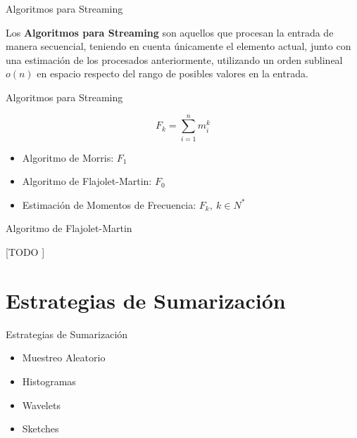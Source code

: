 \documentclass[12pt]{beamer}
\begin{document}
    \begin{frame}[fragile]{Algoritmos para Streaming}

      Los \textbf{Algoritmos para Streaming} son aquellos que procesan la entrada de manera secuencial, teniendo en cuenta únicamente el elemento actual, junto con una estimación de los procesados anteriormente, utilizando un orden sublineal $o(n)$ en espacio respecto del rango de posibles valores en la entrada.

    \end{frame}

    \begin{frame}[fragile]{Algoritmos para Streaming}

      \begin{equation}
        F_k = \sum_{i=1}^n m_i^k
      \end{equation}

      \begin{itemize}
        \item Algoritmo de Morris: $F_1$
        \item Algoritmo de Flajolet-Martin: $F_0$
        \item Estimación de Momentos de Frecuencia: $F_k, \ k \in N^*$
      \end{itemize}

    \end{frame}

    \begin{frame}[fragile]{Algoritmo de Flajolet-Martin}

      [TODO ]

    \end{frame}

  \section{Estrategias de Sumarización}

    \begin{frame}[fragile]{Estrategias de Sumarización}

      \begin{itemize}
        \item Muestreo Aleatorio
        \item Histogramas
        \item Wavelets
        \item Sketches
      \end{itemize}

    \end{frame}
\end{document}
